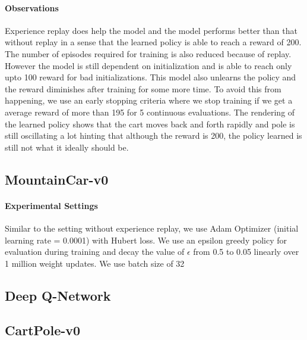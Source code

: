 \documentclass[12pt]{article}
\begin{document}
\paragraph{Observations} Experience replay does help the model and the model performs better than that without replay in a sense that the learned policy is able to reach a reward of 200. The number of episodes required for training is also reduced because of replay. However the model is still dependent on initialization and is able to reach only upto 100 reward for bad initializations. This model also unlearns the policy and the reward diminishes after training for some more time. To avoid this from happening, we use an early stopping criteria where we stop training if we get a average reward of more than 195 for 5 continuous evaluations. The rendering of the learned policy shows that the cart moves back and forth rapidly and pole is still oscillating a lot hinting that although the reward is 200, the policy learned is still not what it ideally should be.

\pagebreak[4]
\subsection*{MountainCar-v0}

\paragraph{Experimental Settings} Similar to the setting without experience replay, we use Adam Optimizer (initial learning rate = 0.0001) with Hubert loss. We use an epsilon greedy policy for evaluation during training and decay the value of $\epsilon$ from 0.5 to 0.05 linearly over 1 million weight updates. We use batch size of 32

\pagebreak[4]
\subsection{Deep Q-Network}
\subsection*{CartPole-v0}
\end{document}
